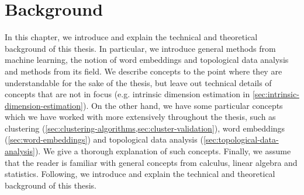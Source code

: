 \chapter{Background}
\label{chap:background}
In this chapter, we introduce and explain the technical and theoretical background of this thesis. In particular, we introduce general methods from machine learning, the notion of word embeddings and topological data analysis and methods from its field. We describe concepts to the point where they are understandable for the sake of the thesis, but leave out technical details of concepts that are not in focus (e.g. intrinsic dimension estimation in \cref{sec:intrinsic-dimension-estimation}). On the other hand, we have some particular concepts which we have worked with more extensively throughout the thesis, such as clustering (\cref{sec:clustering-algorithms,sec:cluster-validation}), word embeddings (\cref{sec:word-embeddings}) and topological data analysis (\cref{sec:topological-data-analysis}). We give a thorough explanation of such concepts. Finally, we assume that the reader is familiar with general concepts from calculus, linear algebra and statistics. Following, we introduce and explain the technical and theoretical background of this thesis.



